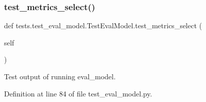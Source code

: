 \subsubsection{\texorpdfstring{test\+\_\+metrics\+\_\+select()}{test\_metrics\_select()}}
{\footnotesize\ttfamily def tests.\+test\+\_\+eval\+\_\+model.\+Test\+Eval\+Model.\+test\+\_\+metrics\+\_\+select (\begin{DoxyParamCaption}\item[{}]{self }\end{DoxyParamCaption})}

\begin{DoxyVerb}Test output of running eval_model.
\end{DoxyVerb}
 

Definition at line 84 of file test\+\_\+eval\+\_\+model.\+py.


